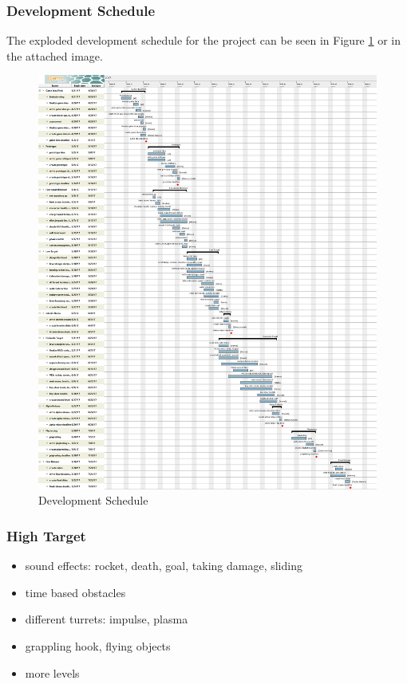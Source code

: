 \documentclass[12pt, letterpaper]{scrartcl}
\begin{document}
	\subsubsection{Development Schedule}
	The exploded development schedule for the project can be seen in Figure \ref{developmentSchedule} or in the attached image.
		\begin{figure}[H]
			\centering
			\includegraphics[height=\textheight]{images/GamesLab2017SS}
			\caption{Development Schedule}
			\label{developmentSchedule}
		\end{figure}
		
	\subsubsection{High Target}
	\begin{itemize}
		\setlength\itemsep{0.1pt}
		\item sound effects: rocket, death, goal, taking damage, sliding
		\item time based obstacles
		\item different turrets: impulse, plasma
		\item grappling hook, flying objects
		\item more levels
	\end{itemize}
	
\end{document}
